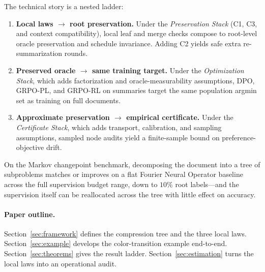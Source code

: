 The technical story is a nested ladder:
\begin{enumerate}[leftmargin=1.5em]
    \item \textbf{Local laws $\rightarrow$ root preservation.} Under the \emph{Preservation Stack} (C1, C3, and context compatibility), local leaf and merge checks compose to root-level oracle preservation and schedule invariance. Adding C2 yields safe extra re-summarization rounds.
    \item \textbf{Preserved oracle $\rightarrow$ same training target.} Under the \emph{Optimization Stack}, which adds factorization and oracle-measurability assumptions, DPO, GRPO-PL, and GRPO-RL on summaries target the same population argmin set as training on full documents.
    \item \textbf{Approximate preservation $\rightarrow$ empirical certificate.} Under the \emph{Certificate Stack}, which adds transport, calibration, and sampling assumptions, sampled node audits yield a finite-sample bound on preference-objective drift.
\end{enumerate}

On the Markov changepoint benchmark, decomposing the document into a tree of subproblems matches or improves on a flat Fourier Neural Operator baseline across the full supervision budget range, down to $10\%$ root labels---and the supervision itself can be reallocated across the tree with little effect on accuracy.

\paragraph{Paper outline.}
Section~\ref{sec:framework} defines the compression tree and the three local laws. Section~\ref{sec:example} develops the color-transition example end-to-end. Section~\ref{sec:theorems} gives the result ladder. Section~\ref{sec:estimation} turns the local laws into an operational audit.
